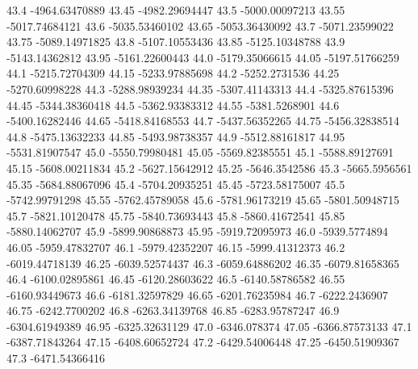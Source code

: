            43.4   -4964.63470889
          43.45   -4982.29694447
           43.5   -5000.00097213
          43.55   -5017.74684121
           43.6   -5035.53460102
          43.65   -5053.36430092
           43.7   -5071.23599022
          43.75   -5089.14971825
           43.8   -5107.10553436
          43.85   -5125.10348788
           43.9   -5143.14362812
          43.95   -5161.22600443
           44.0   -5179.35066615
          44.05   -5197.51766259
           44.1   -5215.72704309
          44.15   -5233.97885698
           44.2    -5252.2731536
          44.25   -5270.60998228
           44.3   -5288.98939234
          44.35   -5307.41143313
           44.4   -5325.87615396
          44.45   -5344.38360418
           44.5   -5362.93383312
          44.55    -5381.5268901
           44.6   -5400.16282446
          44.65   -5418.84168553
           44.7   -5437.56352265
          44.75   -5456.32838514
           44.8   -5475.13632233
          44.85   -5493.98738357
           44.9   -5512.88161817
          44.95   -5531.81907547
           45.0   -5550.79980481
          45.05   -5569.82385551
           45.1   -5588.89127691
          45.15   -5608.00211834
           45.2   -5627.15642912
          45.25    -5646.3542586
           45.3    -5665.5956561
          45.35   -5684.88067096
           45.4   -5704.20935251
          45.45   -5723.58175007
           45.5   -5742.99791298
          45.55   -5762.45789058
           45.6   -5781.96173219
          45.65   -5801.50948715
           45.7   -5821.10120478
          45.75   -5840.73693443
           45.8   -5860.41672541
          45.85   -5880.14062707
           45.9   -5899.90868873
          45.95   -5919.72095973
           46.0    -5939.5774894
          46.05   -5959.47832707
           46.1   -5979.42352207
          46.15   -5999.41312373
           46.2   -6019.44718139
          46.25   -6039.52574437
           46.3   -6059.64886202
          46.35   -6079.81658365
           46.4   -6100.02895861
          46.45   -6120.28603622
           46.5   -6140.58786582
          46.55   -6160.93449673
           46.6   -6181.32597829
          46.65   -6201.76235984
           46.7    -6222.2436907
          46.75    -6242.7700202
           46.8   -6263.34139768
          46.85   -6283.95787247
           46.9   -6304.61949389
          46.95   -6325.32631129
           47.0     -6346.078374
          47.05   -6366.87573133
           47.1   -6387.71843264
          47.15   -6408.60652724
           47.2   -6429.54006448
          47.25   -6450.51909367
           47.3   -6471.54366416
